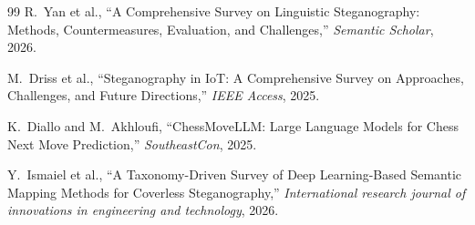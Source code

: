 \documentclass[journal]{IEEEtran}
\begin{document}
\begin{thebibliography}{99}
 R.~Yan et al., ``A Comprehensive Survey on Linguistic Steganography: Methods, Countermeasures, Evaluation, and Challenges,'' \textit{Semantic Scholar}, 2026.

 M.~Driss et al., ``Steganography in IoT: A Comprehensive Survey on Approaches, Challenges, and Future Directions,'' \textit{IEEE Access}, 2025.

 K.~Diallo and M.~Akhloufi, ``ChessMoveLLM: Large Language Models for Chess Next Move Prediction,'' \textit{SoutheastCon}, 2025.

 Y.~Ismaiel et al., ``A Taxonomy-Driven Survey of Deep Learning-Based Semantic Mapping Methods for Coverless Steganography,'' \textit{International research journal of innovations in engineering and technology}, 2026.
\end{thebibliography}
\end{document}
